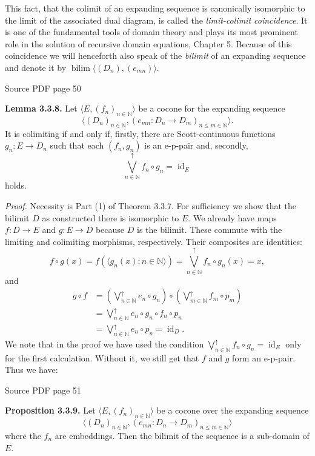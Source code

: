 \documentclass[11pt]{article}
\newcommand{\leanmarker}[2]{%
  \Needspace{3\baselineskip}%
  \marginnote{\hyperlink{#1}{\color{LeanTeal}\fbox{\scriptsize Lean}}}%
  \hypertarget{#1}{\textbf{#2.}}%
}
\newcommand{\sourcepage}[1]{\par\medskip\noindent\textcolor{SourceGray}{\scriptsize Source PDF page #1}\par\smallskip}
\begin{document}
This fact, that the colimit of an expanding sequence is canonically isomorphic to the limit of the associated dual diagram, is called the \emph{limit-colimit coincidence}. It is one of the fundamental tools of domain theory and plays its most prominent role in the solution of recursive domain equations, Chapter 5. Because of this coincidence we will henceforth also speak of the \emph{bilimit} of an expanding sequence and denote it by $\operatorname{bilim}\langle(D_n),(e_{mn})\rangle$.

\sourcepage{50}
\leanmarker{lemma-3-3-8}{Lemma 3.3.8} Let $\langle E,(f_n)_{n\in\mathbb{N}}\rangle$ be a cocone for the expanding sequence
\[
  \langle(D_n)_{n\in\mathbb{N}},(e_{mn}:D_n\to D_m)_{n\le m\in\mathbb{N}}\rangle.
\]
It is colimiting if and only if, firstly, there are Scott-continuous functions $g_n:E\to D_n$ such that each $(f_n,g_n)$ is an e-p-pair and, secondly,
\[
  \bigvee^{\uparrow}_{n\in\mathbb{N}} f_n\circ g_n=\operatorname{id}_E
\]
holds.

\emph{Proof.} Necessity is Part (1) of Theorem 3.3.7. For sufficiency we show that the bilimit $D$ as constructed there is isomorphic to $E$. We already have maps $f:D\to E$ and $g:E\to D$ because $D$ is the bilimit. These commute with the limiting and colimiting morphisms, respectively. Their composites are identities:
\[
  f\circ g(x)=f(\langle g_n(x):n\in\mathbb{N}\rangle)
    =\bigvee^{\uparrow}_{n\in\mathbb{N}}f_n\circ g_n(x)=x,
\]
and
\[
\begin{aligned}
  g\circ f
  &=\left(\bigvee^{\uparrow}_{n\in\mathbb{N}}e_n\circ g_n\right)\circ
    \left(\bigvee^{\uparrow}_{m\in\mathbb{N}}f_m\circ p_m\right)\\
  &=\bigvee^{\uparrow}_{n\in\mathbb{N}} e_n\circ g_n\circ f_n\circ p_n\\
  &=\bigvee^{\uparrow}_{n\in\mathbb{N}} e_n\circ p_n
    =\operatorname{id}_D.
\end{aligned}
\]
We note that in the proof we have used the condition $\bigvee^{\uparrow}_{n\in\mathbb{N}}f_n\circ g_n=\operatorname{id}_E$ only for the first calculation. Without it, we still get that $f$ and $g$ form an e-p-pair. Thus we have:

\sourcepage{51}
\leanmarker{prop-3-3-9}{Proposition 3.3.9} Let $\langle E,(f_n)_{n\in\mathbb{N}}\rangle$ be a cocone over the expanding sequence
\[
  \langle(D_n)_{n\in\mathbb{N}},(e_{mn}:D_n\to D_m)_{n\le m\in\mathbb{N}}\rangle
\]
where the $f_n$ are embeddings. Then the bilimit of the sequence is a sub-domain of $E$.
\end{document}

